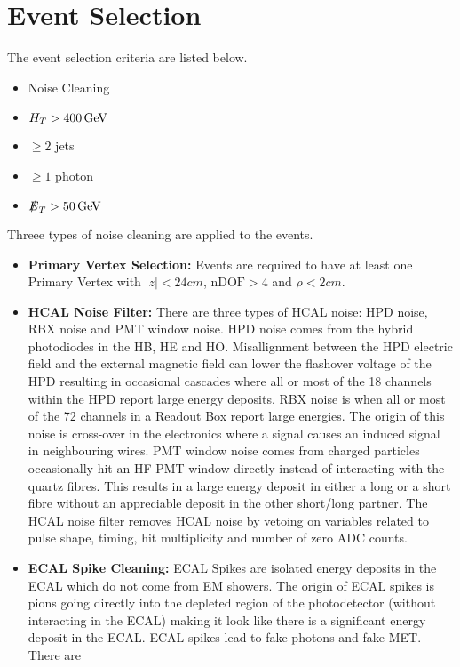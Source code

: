 \section{Event Selection}

The event selection criteria are listed below. 

\begin{itemize}
\item Noise Cleaning
\item $H_{T} > 400 \, \mathrm{GeV}$
\item $\geq 2$ jets
\item $\geq 1$ photon
\item $\slashed{E}_{T} > 50 \, \mathrm{GeV}$
\end{itemize}

Threee types of noise cleaning are applied to the events. 
\begin{itemize}
\item {\bf Primary Vertex Selection:} Events are required to have at least one
Primary Vertex with $|z| < 24\unit{cm}$, $\mbox{nDOF} > 4$ and $\rho <
2\unit{cm}$.
\item {\bf HCAL Noise Filter:} There are three types of HCAL noise: HPD noise, 
RBX noise and PMT window noise. HPD noise comes from the hybrid photodiodes in
the HB, HE and HO. Misallignment between the HPD electric field and the external
magnetic field can lower the flashover voltage of the HPD resulting in 
occasional cascades where all or most of the 18 channels within the HPD report
large energy deposits. RBX noise is when all or most of the 72 channels in a
Readout Box report large energies. The origin of this noise is cross-over in the
electronics where a signal causes an induced signal in neighbouring wires.
PMT window noise comes from charged particles occasionally hit an HF PMT window 
directly instead of interacting with the quartz fibres. This results in a large 
energy deposit in either a long or a short fibre without an appreciable deposit 
in the other short/long partner. The HCAL noise filter removes HCAL noise by 
vetoing on variables related to pulse shape, timing, hit multiplicity and number
of zero ADC counts.
\item {\bf ECAL Spike Cleaning:} ECAL Spikes are isolated energy deposits in 
the ECAL which do not come from EM showers. The origin of ECAL spikes is pions
going directly into the depleted region of the photodetector (without
interacting in the ECAL) making it look like there is a significant energy 
deposit in the ECAL. ECAL spikes lead to fake photons and fake MET. There are 

\end{itemize}
